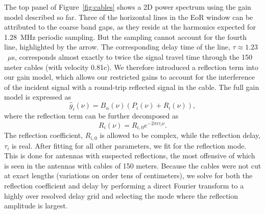 \documentclass[iop]{emulateapj}
\begin{document}
The top panel of Figure~\ref{fig:cables} shows a 2D power spectrum using the gain model 
described so far. Three of the horizontal lines in the EoR window can be attributed to the 
coarse band gaps, as they reside at the harmonics expected for 1.28~MHz periodic 
sampling. But the sampling cannot account for the fourth line, highlighted by the arrow. The 
corresponding delay time of the line, $\tau \approx 1.23$~$\mu$s, corresponds almost 
exactly to twice the signal travel time through the 150 meter cables (with velocity 0.81c). We 
therefore introduced a reflection term into our gain model, which allows our restricted gains 
to account for the interference of the incident signal with a round-trip reflected signal in the 
cable. The full gain model is expressed as
\begin{equation}\label{eq:cal2}
\hat{g}_i(\nu)=B_{\alpha}(\nu)\left(P_i(\nu)+R_i(\nu)\right),
\end{equation}
where the reflection term can be further decomposed as
\begin{equation}
R_i(\nu) = R_{i,0} e^{-2\pi i \tau_{i} \nu}.
\end{equation}
The reflection coefficient, $R_{i,0}$ is allowed to be complex, while the reflection delay, 
$\tau_i$ is real. After fitting for all other parameters, we fit for the reflection mode. This is 
done for antennas with suspected reflections, the most offensive of which is seen in the 
antennas with cables of 150 meters. Because the cables were not cut at exact lengths 
(variations on order tens of centimeters), we solve for both the reflection coefficient and 
delay by performing a direct Fourier transform to a highly over resolved delay grid and 
selecting the mode where the reflection amplitude is largest. 
\end{document}
